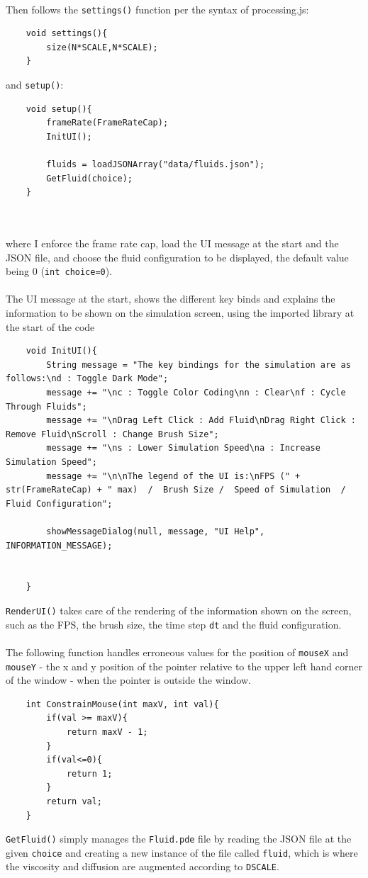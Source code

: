 \documentclass[12pt,a4paper]{book}
\begin{document}
\\
Then follows the \verb|settings()| function per the syntax of processing.js:
\begin{lstlisting}
	void settings(){
		size(N*SCALE,N*SCALE);
	}
\end{lstlisting}
and \verb|setup()|:
\begin{lstlisting}
	void setup(){
		frameRate(FrameRateCap);
		InitUI();
		
		fluids = loadJSONArray("data/fluids.json");
		GetFluid(choice);
	}
	
	
\end{lstlisting}
where I enforce the frame rate cap, load the UI message at the start and the JSON file, and choose the fluid configuration to be displayed, the default value being 0 (\verb|int choice=0|). \\
\\

The UI message at the start, shows the different key binds and explains the information to be shown on the simulation screen, using the imported library at the start of the code
\begin{lstlisting}
	void InitUI(){  
		String message = "The key bindings for the simulation are as follows:\nd : Toggle Dark Mode";
		message += "\nc : Toggle Color Coding\nn : Clear\nf : Cycle Through Fluids";
		message += "\nDrag Left Click : Add Fluid\nDrag Right Click : Remove Fluid\nScroll : Change Brush Size";
		message += "\ns : Lower Simulation Speed\na : Increase Simulation Speed";
		message += "\n\nThe legend of the UI is:\nFPS (" + str(FrameRateCap) + " max)  /  Brush Size /  Speed of Simulation  /  Fluid Configuration";
		
		showMessageDialog(null, message, "UI Help", INFORMATION_MESSAGE);
		
		
	}
\end{lstlisting}
\verb|RenderUI()| takes care of the rendering of the information shown on the screen, such as the FPS, the brush size, the time step \verb|dt| and the fluid configuration.\\
\\
The following function handles erroneous values for the position of \verb|mouseX| and \verb|mouseY| - the x and y position of the pointer relative to the upper left hand corner of the window - when the pointer is outside the window.
\begin{lstlisting}
	int ConstrainMouse(int maxV, int val){
		if(val >= maxV){
			return maxV - 1;
		}
		if(val<=0){
			return 1; 
		}
		return val;
	}
\end{lstlisting}
\verb|GetFluid()| simply manages the \verb|Fluid.pde| file by reading the JSON file at the given \verb|choice| and creating a new instance of the file called \verb|fluid|, which is where the viscosity and diffusion are augmented according to \verb|DSCALE|.
\end{document}
